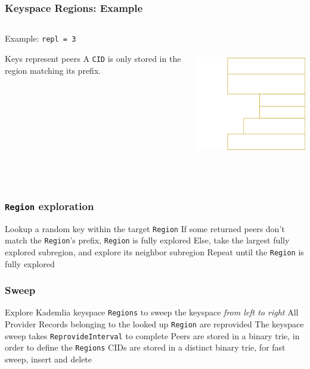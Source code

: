 \documentclass{../pl-slide}
\begin{document}
\begin{frame}
\frametitle{Keyspace Regions: Example}


\begin{columns}[onlytextwidth]
	\begin{column}{0.39\textwidth}
		{\large Example: \texttt{repl = 3}}
		\bigskip
		\begin{itemize}
			\itemc Keys represent peers
			\itemc A \texttt{CID} is only stored in the region matching its prefix.
		\end{itemize}
	\end{column}
	\begin{column}{0.59\textwidth}
    		\begin{center}
        		\includegraphics[height=17em]{resources/regions-defined.png}
    		\end{center}
	\end{column}
\end{columns}

\end{frame}

\begin{frame}
\frametitle{\texttt{Region} exploration}

\begin{itemize}
	\itemc Lookup a random key within the target \texttt{Region}
	\itemc If some returned peers don't match the \texttt{Region}'s prefix, \texttt{Region} is fully explored
	\itemc Else, take the largest fully explored subregion, and explore its neighbor subregion
	\itemc Repeat until the \texttt{Region} is fully explored
\end{itemize}
\end{frame}


\begin{frame}
\frametitle{Sweep}

\begin{itemize}
	\itemc Explore Kademlia keyspace \texttt{Regions} to sweep the keyspace \textit{from left to right}
	\itemc All Provider Records belonging to the looked up \texttt{Region} are reprovided
	\itemc The keyspace sweep takes \texttt{ReprovideInterval} to complete
	\bigskip
	\itemc Peers are stored in a binary trie, in order to define the \texttt{Regions}
	\itemc CIDs are stored in a distinct binary trie, for fast sweep, insert and delete
\end{itemize}
\end{frame}
\end{document}
